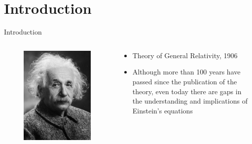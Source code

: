 \documentclass{beamer}
\begin{document}
\section{Introduction}
\begin{frame}{Introduction}
	\begin{columns}
		\begin{column}{0.5\textwidth}
			\begin{figure}[h]
				\centering
				\includegraphics[width=0.9\linewidth]{images/Albert_Einstein_Head}
			\end{figure}
		\end{column}
		\begin{column}{0.5\textwidth}
			\begin{itemize}
				\item Theory of General Relativity, 1906
				\item Although more than 100 years have passed since the publication of the theory, even today there are gaps in the understanding and implications of Einstein's equations
			\end{itemize}
		\end{column}
	\end{columns}
\end{frame}
\end{document}

